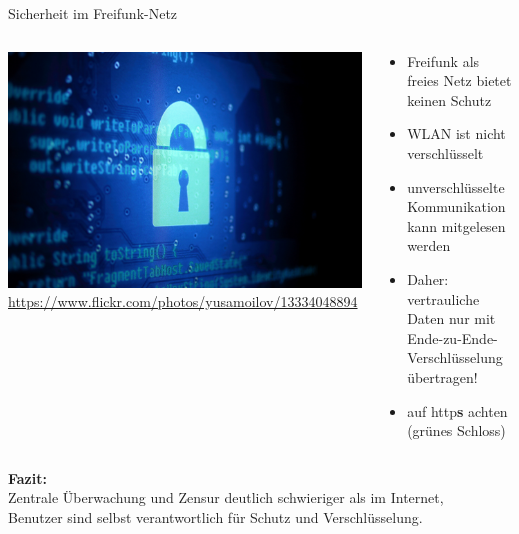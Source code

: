 \documentclass[10pt]{beamer}
\begin{document}
    \begin{frame}{Sicherheit im Freifunk-Netz}
      \begin{columns}[c]
        \begin{column}{5cm}
          \includegraphics[width=\textwidth]{images/lock}
          \newline \tiny \url{https://www.flickr.com/photos/yusamoilov/13334048894}
        \end{column}
        \begin{column}{7cm}
          \begin{itemize}
            \pause\item Freifunk als freies Netz bietet keinen Schutz
            \pause\item WLAN ist nicht verschlüsselt
            \pause\item unverschlüsselte Kommunikation kann mitgelesen werden
            \pause\item Daher: vertrauliche Daten nur mit Ende-zu-Ende-Verschlüsselung übertragen!
            \pause\item auf http\textbf{s} achten (grünes Schloss)
          \end{itemize}
        \end{column}
      \end{columns}
      \vfill
      \pause
      \textbf{Fazit:}\\Zentrale Überwachung und Zensur deutlich schwieriger als im Internet, \\
      Benutzer sind selbst verantwortlich für Schutz und Verschlüsselung.
    \end{frame}
\end{document}
